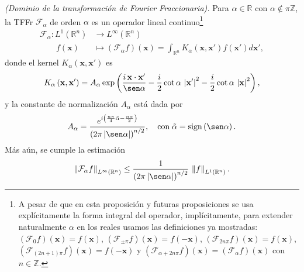             \begin{proposition}\label{prop:dominio}
                \textit{(Dominio de la transformación de Fourier Fraccionaria).} Para $\alpha \in \mathbb{R}$ con $\alpha \notin \pi\mathbb{Z}$, la TFFr $\mathcal{F}_\alpha$ de orden $\alpha$ es un operador lineal continuo\footnote{A pesar de que en esta proposición y futuras proposiciones se usa explícitamente la forma integral del operador, implícitamente, para extender naturalmente $\alpha$ en los reales usamos las definiciones ya mostradas: $(\mathcal{F}_0 f)(\mathbf{x})=f(\mathbf{x})$, $\left(\mathcal{F}_{\pm\pi}f\right)(\mathbf{x})=f\left(-\mathbf{x}\right)$, $\left(\mathcal{F}_{2n\pi}f\right)(\mathbf{x}) = f\left(\mathbf{x}\right)$, $\left(\mathcal{F}_{\left(2n+1\right)\pi}f\right)\left(\mathbf{x}\right)=f\left(-\mathbf{x}\right)$ y $\left(\mathcal{F}_{\alpha + 2n\pi} f\right)(\mathbf{x}) = \left(\mathcal{F}_\alpha f\right)(\mathbf{x})$ con $n \in \mathbb{Z}$.} 
                \begin{equation}
                    \begin{split}
                        \mathcal{F}_\alpha: L^1\left(\mathbb{R}^n\right) & \longrightarrow L^\infty \left(\mathbb{R}^n\right)\\
                        \qquad f\left(\mathbf{x}\right) & \longmapsto \left(\mathcal{F}_\alpha f\right)(\mathbf{x}) = \int_{\mathbb{R}^n}K_\alpha(\mathbf{x},\mathbf{x}')f(\mathbf{x}')d\mathbf{x}',
                    \end{split}
                \end{equation} 
                donde el kernel $K_\alpha\left(\mathbf{x},\mathbf{x}'\right)$ es 
                \begin{equation}\label{eq:Cap2KernelReal}
                    K_\alpha \left(\mathbf{x},\mathbf{x}'\right) = A_\alpha \exp \left(\frac{i\,\mathbf{x}\cdot\mathbf{x}'}{\sen\alpha} -\frac{i}{2}\cot\alpha\, \left|\mathbf{x}'\right|^2  -\frac{i}{2}\cot\alpha\, \left|\mathbf{x}\right|^2\right),
                \end{equation}
                y la constante de normalización $A_\alpha$ está dada por 
                \begin{equation}
                    A_\alpha = \frac{e^{i \left(\frac{n\pi}{4}\tilde{\alpha} - \frac{n\alpha}{2} \right)}}{\left( 2\pi \left|\sen\alpha \right| \right)^{n/2}}, \quad \text{con} \; \tilde{\alpha} = \operatorname{sign}\left(\sen\alpha \right).
                \end{equation}
                Más aún, se cumple la estimación
                \begin{equation}\label{eq:Cap2CotaL1Linf}
                    \left\| \mathcal{F}_\alpha f \right\|_{L^\infty(\mathbb{R}^n)} \leq \frac{1}{\left( 2\pi \left|\sen\alpha \right| \right)^{n/2}} \, \left\| f \right\|_{L^1(\mathbb{R}^n)}.
                \end{equation}
            \end{proposition}

